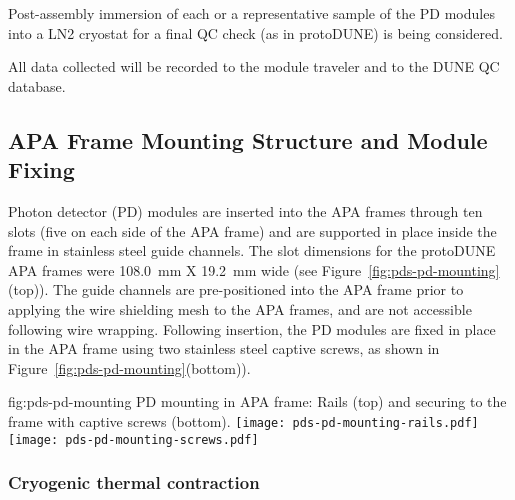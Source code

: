 Post-assembly immersion of each or a representative sample of the PD modules into a LN2 cryostat for a final QC check (as in protoDUNE) is being considered.

All data collected will be recorded to the module traveler and to the DUNE QC database.







\subsection{APA Frame Mounting Structure and Module Fixing}	
\label{sec:fdsp-pd-assy-frames}

Photon detector (PD) modules are inserted into the APA frames through ten slots 
(five on each side of the APA frame) and are supported in place inside the frame in 
stainless steel guide channels.  The slot dimensions for the protoDUNE APA frames 
were 108.0~mm X 19.2~mm wide (see Figure~\ref{fig:pds-pd-mounting}(top)).  The guide channels are pre-positioned into 
the APA frame prior to applying the wire shielding mesh to the APA frames, and are
not accessible following wire wrapping. Following insertion, the PD modules are fixed in place in the APA frame using
 two stainless steel captive screws, as shown in Figure~\ref{fig:pds-pd-mounting}(bottom)).


\begin{dunefigure}{fig:pds-pd-mounting}
{PD mounting in APA frame: Rails (top) and securing to the frame with captive screws  (bottom).}
	\texttt{[image: pds-pd-mounting-rails.pdf]}
	\texttt{[image: pds-pd-mounting-screws.pdf]}
\end{dunefigure}




\subsubsection{Cryogenic thermal contraction}

